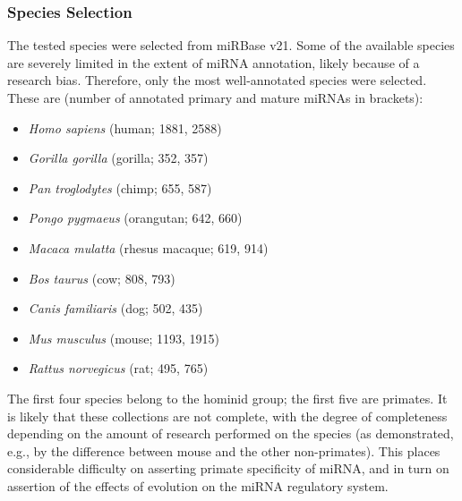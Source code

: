 \begin{method}

\subsubsection{Species Selection}
The tested species were selected from miRBase v21. Some of the available species are severely limited in the extent of miRNA annotation, likely because of a research bias. Therefore, only the most well-annotated species were selected. These are (number of annotated primary and mature miRNAs in brackets):
\begin{itemize}[noitemsep, leftmargin=.5cm, label={\tiny\raisebox{.5ex}{\textbullet}}]
\item \emph{Homo sapiens} (human; 1881, 2588)
\item \emph{Gorilla gorilla} (gorilla; 352, 357)
\item \emph{Pan troglodytes} (chimp; 655, 587)
\item \emph{Pongo pygmaeus} (orangutan; 642, 660)
\item \emph{Macaca mulatta} (rhesus macaque; 619, 914)
\item \emph{Bos taurus} (cow; 808, 793)
\item \emph{Canis familiaris} (dog; 502, 435)
\item \emph{Mus musculus} (mouse; 1193, 1915)
\item \emph{Rattus norvegicus} (rat; 495, 765)
\end{itemize}
The first four species belong to the hominid group; the first five are primates. It is likely that these collections are not complete, with the degree of completeness depending on the amount of research performed on the species (as demonstrated, e.g., by the difference between mouse and the other non-primates). This places considerable difficulty on asserting primate specificity of miRNA, and in turn on assertion of the effects of evolution on the miRNA regulatory system.


\end{method}
